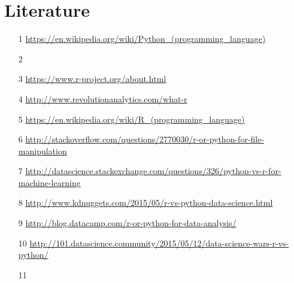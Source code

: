 \documentclass{article}
\begin{document}
\section{Literature}
\begin{enumerate}
    \item[1] \url{https://en.wikipedia.org/wiki/Python_(programming_language)}
    \item[2]
    \item[3] \url{https://www.r-project.org/about.html}
    \item[4] \url{http://www.revolutionanalytics.com/what-r}
    \item[5] \url{https://en.wikipedia.org/wiki/R_(programming_language)}
    \item[6] \url{http://stackoverflow.com/questions/2770030/r-or-python-for-file-manipulation}
    \item[7] \url{http://datascience.stackexchange.com/questions/326/python-vs-r-for-machine-learning}
    \item[8] \url{http://www.kdnuggets.com/2015/05/r-vs-python-data-science.html}
    \item[9] \url{http://blog.datacamp.com/r-or-python-for-data-analysis/}
    \item[10] \url{http://101.datascience.community/2015/05/12/data-science-wars-r-vs-python/}
    \item[11]
\end{enumerate}
\end{document}
